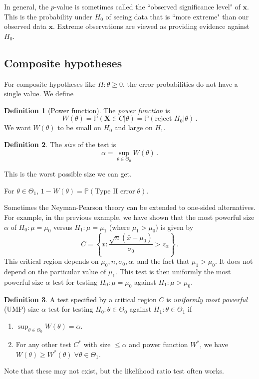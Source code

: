 \documentclass[a4paper,11pt]{article}
\theoremstyle{definition}
\newtheorem*{defn}{Definition}
\numberwithin{equation}{section}
\begin{document}
In general, the $p$-value is sometimes called the ``observed significance level" of $\mathbf{x}$. This is the probability under $H_0$ of seeing data that is ``more extreme" than our observed data $\mathbf{x}$. Extreme observations are viewed as providing evidence against $H_0$.

\subsection{Composite hypotheses}
For composite hypotheses like $H:\theta\geq0$, the error probabilities do not have a single value. We define

\begin{defn}[Power function]
The \emph{power function} is
\[
W(\theta)=\mathbb{P}(\mathbf{X}\in C|\theta)=\mathbb{P}(\text{reject }H_0|\theta)\,.
\]
We want $W(\theta)$ to be small on $H_0$ and large on $H_1$.
\end{defn}

\begin{defn}
The \emph{size} of the test is
\[
\alpha=\sup_{\theta\in\Theta_0}W(\theta)\,.
\]
\end{defn}

This is the worst possible size we can get.

For $\theta\in\Theta_1$, $1-W(\theta)=\mathbb{P}(\text{Type II error}|\theta)$.

Sometimes the Neyman-Pearson theory can be extended to one-sided alternatives. For example, in the previous example, we have shown that the most powerful size $\alpha$ of $H_0:\mu=\mu_0$ versus $H_1:\mu=\mu_1$ (where $\mu_1>\mu_0$) is given by 
\[
C=\left\{x:\frac{\sqrt{n}(\bar{x}-\mu_0)}{\sigma_0}>z_\alpha\right\}\,.
\]
This critical region depends on $\mu_0,n,\sigma_0,\alpha$, and the fact that $\mu_1>\mu_0$. It does not depend on the particular value of $\mu_1$. This test is then uniformly the most powerful size $\alpha$ test for testing $H_0:\mu=\mu_0$ against $H_1:\mu>\mu_0$.

\begin{defn}
A test specified by a critical region $C$ is \emph{uniformly most powerful} (UMP) size $\alpha$ test for testing $H_0:\theta\in\Theta_0$ against $H_1:\theta\in\Theta_1$ if
\begin{enumerate}
    \item $\sup_{\theta\in\Theta_0}W(\theta)=\alpha$.
    \item For any other test $C^*$ with size $\leq\alpha$ and power function $W^*$, we have $W(\theta)\geq W^*(\theta)\;\forall\theta\in\Theta_1$.
\end{enumerate}
Note that these may not exist, but the likelihood ratio test often works.
\end{defn}
\end{document}
